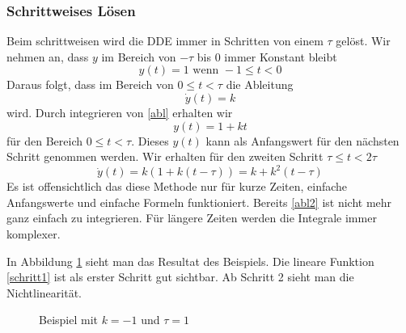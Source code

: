 \subsubsection{Schrittweises Lösen}
Beim schrittweisen wird die DDE immer in Schritten von einem $\tau$ gelöst.
Wir nehmen an, dass $y$ im Bereich von $-\tau$ bis $0$ immer Konstant bleibt
\begin{equation}
	y(t)=1 \text{ wenn } -1\le t<0
\end{equation}
Daraus folgt, dass im Bereich von $0\le t<\tau$ die Ableitung
\begin{equation}\label{abl}
	\dot{y}(t)=k
\end{equation}
wird. Durch integrieren von \eqref{abl} erhalten wir
\begin{equation}\label{schritt1}
	y(t)=1+kt
\end{equation}
für den Bereich $0\le t<\tau$. 
Dieses $y(t)$ kann als Anfangswert für den nächsten Schritt genommen werden.
Wir erhalten für den zweiten Schritt  $\tau\le t<2\tau$ 
\begin{equation}\label{abl2}
	\dot{y}(t)=k(1+k(t-\tau))=k+k^2(t-\tau)
\end{equation}
Es ist offensichtlich das diese Methode nur für kurze Zeiten, einfache Anfangswerte und einfache Formeln funktioniert. 
Bereits \eqref{abl2} ist nicht mehr ganz einfach zu integrieren. 
Für längere Zeiten werden die Integrale immer komplexer.

In Abbildung \ref{fig:bsp} sieht man das Resultat des Beispiels. 
Die lineare Funktion \eqref{schritt1} ist als erster Schritt gut sichtbar.
Ab Schritt 2 sieht man die Nichtlinearität. 
\begin{figure}
	\centering
	
	\caption{Beispiel mit $k=-1$ und $\tau=1$}
	\label{fig:bsp}
\end{figure}

